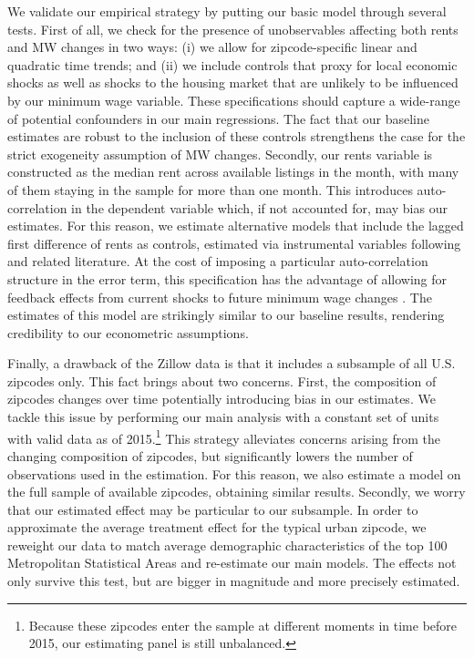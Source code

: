 We validate our empirical strategy by putting our basic model through several tests. First of all, 
we check for the presence of unobservables affecting both rents and MW changes in two ways: 
(i) we allow for zipcode-specific linear and quadratic time trends; and (ii) we include 
controls that proxy for local economic shocks as well as shocks to the housing market that are 
unlikely to be influenced by our minimum wage variable.
These specifications should capture a wide-range of potential confounders in our main 
regressions. The fact that our baseline estimates are robust to the inclusion of these 
controls strengthens the case for the strict exogeneity assumption of MW changes. Secondly, 
our rents variable is constructed as the median rent across available listings in the month, 
with many of them staying in the sample for more than one month. This introduces 
auto-correlation in the dependent variable which, if not accounted for, may bias our estimates. 
For this reason, we estimate alternative models that include the lagged first difference of rents 
as controls, estimated via instrumental variables following \textcite{ArellanoBond1991} and 
related literature. At the cost of imposing a particular auto-correlation structure in the 
error term, this specification has the advantage of allowing for feedback effects from current 
shocks to future minimum wage changes \parencite{ArellanoHonore2001}. The estimates of this 
model are strikingly similar to our baseline results, rendering credibility to our econometric 
assumptions.

Finally, a drawback of the Zillow data is that it includes a subsample of all U.S. zipcodes 
only. This fact brings about two concerns. First, the composition of zipcodes changes over 
time potentially introducing bias in our estimates. We tackle this issue by performing our 
main analysis with a constant set of units with valid data as of 2015.\footnote{Because these 
	zipcodes enter the sample at different 	moments in time before 2015, our estimating panel 
	is still unbalanced.}
This strategy alleviates concerns arising from the changing composition of zipcodes, but 
significantly lowers the number of observations used in the estimation. For this reason, we 
also estimate a model on the full sample of available zipcodes, obtaining similar results. 
Secondly, we worry that our estimated effect may be particular to our subsample. In order to 
approximate the average treatment effect for the typical urban zipcode, we reweight our data to 
match average demographic characteristics of the top 100 Metropolitan Statistical Areas 
and re-estimate our main models. The effects not only survive this test, but are bigger in 
magnitude and more precisely estimated.

